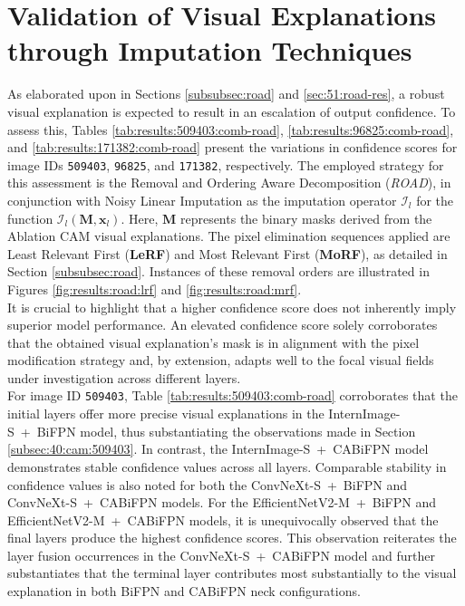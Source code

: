 \section{Validation of Visual Explanations through Imputation Techniques} \label{sec:validation-imputation}
As elaborated upon in Sections \ref{subsubsec:road} and \ref{sec:51:road-res}, a robust visual explanation is expected to result in an escalation of output confidence. To assess this, Tables \ref{tab:results:509403:comb-road}, \ref{tab:results:96825:comb-road}, and \ref{tab:results:171382:comb-road} present the variations in confidence scores for image IDs \texttt{509403}, \texttt{96825}, and \texttt{171382}, respectively. The employed strategy for this assessment is the Removal and Ordering Aware Decomposition (\textit{ROAD}), in conjunction with Noisy Linear Imputation as the imputation operator \(\mathcal{I}_l\) for the function \(\mathcal{I}_l(\boldsymbol{M}, \boldsymbol{x}_l)\). Here, \(\boldsymbol{M}\) represents the binary masks derived from the Ablation CAM visual explanations. The pixel elimination sequences applied are Least Relevant First (\textbf{LeRF}) and Most Relevant First (\textbf{MoRF}), as detailed in Section \ref{subsubsec:road}. Instances of these removal orders are illustrated in Figures \ref{fig:results:road:lrf} and \ref{fig:results:road:mrf}.\\

It is crucial to highlight that a higher confidence score does not inherently imply superior model performance. An elevated confidence score solely corroborates that the obtained visual explanation's mask is in alignment with the pixel modification strategy and, by extension, adapts well to the focal visual fields under investigation across different layers.\\

For image ID \texttt{509403}, Table \ref{tab:results:509403:comb-road} corroborates that the initial layers offer more precise visual explanations in the InternImage-S~+~BiFPN model, thus substantiating the observations made in Section \ref{subsec:40:cam:509403}. In contrast, the InternImage-S~+~CABiFPN model demonstrates stable confidence values across all layers. Comparable stability in confidence values is also noted for both the ConvNeXt-S~+~BiFPN and ConvNeXt-S~+~CABiFPN models. For the EfficientNetV2-M~+~BiFPN and EfficientNetV2-M~+~CABiFPN models, it is unequivocally observed that the final layers produce the highest confidence scores. This observation reiterates the layer fusion occurrences in the ConvNeXt-S~+~CABiFPN model and further substantiates that the terminal layer contributes most substantially to the visual explanation in both BiFPN and CABiFPN neck configurations.\\

